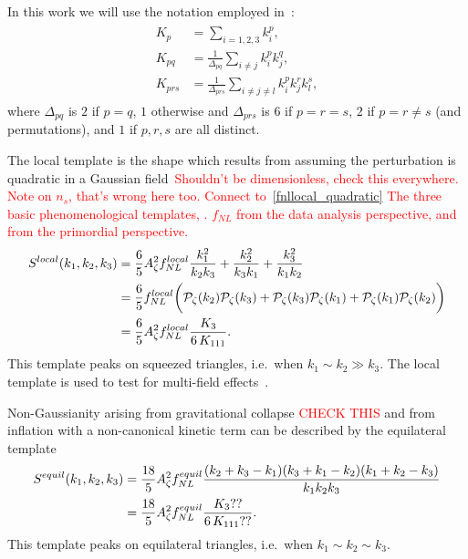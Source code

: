 In this work we will use the notation employed in~\cite{FergShell_2}:
\begin{align}\label{shape_notation}
\begin{split}
    K_p &= \sum_{i=1,2,3} k_i^p, \\
    K_{pq} &= \frac{1}{\Delta_{pq}}\sum_{i\neq j} k_i^p k_j^q,   \\
    K_{prs} &= \frac{1}{\Delta_{prs}}\sum_{i\neq j\neq l} k_i^p k_j^r k_l^s,
\end{split}
\end{align}
where $\Delta_{pq}$ is $2$ if $p=q$, $1$ otherwise
and $\Delta_{prs}$ is $6$ if $p=r=s$, $2$ if $p=r\neq s$ (and permutations),
and $1$ if $p,r,s$ are all distinct.


    The local template is the shape which results from assuming the perturbation is
    quadratic in a Gaussian field~\textcolor{red}{Shouldn't be dimensionless, check
    this everywhere. Note on $n_s$, that's wrong here too.
    Connect to~\eqref{fnllocal_quadratic}
    The three basic phenomenological templates, \planck.
    $f_{NL}$ from the data analysis perspective,
    and from the primordial perspective.
    }
\begin{align}\label{local_shape}
S^{local}(k_1,k_2,k_3)
    &= \frac{6}{5}A_\zeta^2f^{local}_{NL}\frac{k_1^2}{k_2k_3}+\frac{k_2^2}{k_3k_1}+\frac{k_3^2}{k_1k_2}\\
    &= \frac{6}{5}f^{local}_{NL}\bigg(
        \mathcal{P}_{\mathcal{\zeta}}(k_2)\mathcal{P}_{\mathcal{\zeta}}(k_3)
        +\mathcal{P}_{\mathcal{\zeta}}(k_3)\mathcal{P}_{\mathcal{\zeta}}(k_1)
        +\mathcal{P}_{\mathcal{\zeta}}(k_1)\mathcal{P}_{\mathcal{\zeta}}(k_2)
    \bigg)\\
    &= \frac{6}{5}A_\zeta^2f^{local}_{NL}\frac{K_3}{6\,K_{111}}.
\end{align}
This template peaks on squeezed triangles, i.e.\ when $k_1\sim k_2\gg k_3$.
    The local template is used to test for multi-field effects~\cite{Planck_NG_2015}.


    Non-Gaussianity arising from gravitational collapse \textcolor{red}{CHECK THIS}
    and from inflation with a non-canonical kinetic term can be described by the
    equilateral template
\begin{align}\label{equil_shape}
    S^{equil}(k_1,k_2,k_3)
    &= \frac{18}{5}A_\zeta^2f^{equil}_{NL}\frac{(k_2+k_3-k_1)(k_3+k_1-k_2)(k_1+k_2-k_3)}{k_1k_2k_3}\\
    &= \frac{18}{5}A_\zeta^2f^{equil}_{NL}\frac{K_3??}{6\,K_{111}??}.
\end{align}
This template peaks on equilateral triangles, i.e.\ when $k_1\sim k_2\sim k_3$.


